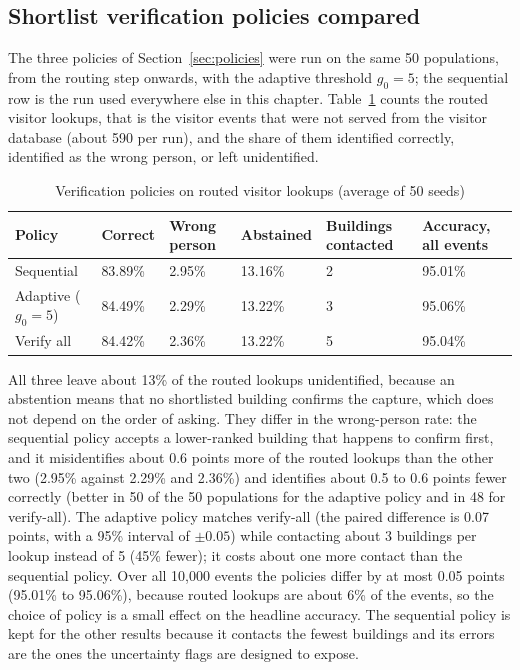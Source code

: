 \documentclass[12pt,a4paper,oneside]{report}
\begin{document}
\subsection{Shortlist verification policies compared}\label{sec:res-policies}
The three policies of Section~\ref{sec:policies} were run on the same 50 populations, from the routing step onwards, with the adaptive threshold $g_0=5$; the sequential row is the run used everywhere else in this chapter. Table~\ref{tab:policies} counts the routed visitor lookups, that is the visitor events that were not served from the visitor database (about 590 per run), and the share of them identified correctly, identified as the wrong person, or left unidentified.

\begin{table}[htbp]
\centering
\caption{Verification policies on routed visitor lookups (average of 50 seeds)}\label{tab:policies}
{\small\setlength{\tabcolsep}{4pt}\renewcommand{\arraystretch}{1.2}
\begin{tabular}{|p{3.0cm}|p{1.9cm}|p{2.2cm}|p{2.0cm}|p{2.3cm}|p{2.2cm}|}\hline
\textbf{Policy} & \textbf{Correct} & \textbf{Wrong person} & \textbf{Abstained} & \textbf{Buildings contacted} & \textbf{Accuracy, all events}\\\hline
Sequential & 83.89\% & 2.95\% & 13.16\% & 2 & 95.01\%\\\hline
Adaptive ($g_0=5$) & 84.49\% & 2.29\% & 13.22\% & 3 & 95.06\%\\\hline
Verify all & 84.42\% & 2.36\% & 13.22\% & 5 & 95.04\%\\\hline
\end{tabular}}
\end{table}

All three leave about 13\% of the routed lookups unidentified, because an abstention means that no shortlisted building confirms the capture, which does not depend on the order of asking. They differ in the wrong-person rate: the sequential policy accepts a lower-ranked building that happens to confirm first, and it misidentifies about 0.6 points more of the routed lookups than the other two (2.95\% against 2.29\% and 2.36\%) and identifies about 0.5 to 0.6 points fewer correctly (better in 50 of the 50 populations for the adaptive policy and in 48 for verify-all). The adaptive policy matches verify-all (the paired difference is 0.07 points, with a 95\% interval of $\pm0.05$) while contacting about 3 buildings per lookup instead of 5 (45\% fewer); it costs about one more contact than the sequential policy. Over all 10,000 events the policies differ by at most 0.05 points (95.01\% to 95.06\%), because routed lookups are about 6\% of the events, so the choice of policy is a small effect on the headline accuracy. The sequential policy is kept for the other results because it contacts the fewest buildings and its errors are the ones the uncertainty flags are designed to expose.
\end{document}
